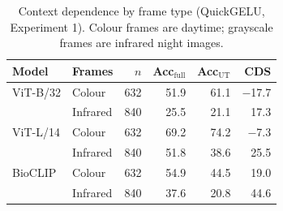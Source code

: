 \begin{table}[t]
\caption{Context dependence by frame type (QuickGELU, Experiment 1). Colour frames are daytime; grayscale frames are infrared night images.}
\label{tab:daynight}
\centering\footnotesize
\setlength{\tabcolsep}{4pt}
\begin{tabular}{ll r rrr}
\toprule
Model & Frames & $n$ & Acc$_\text{full}$ & Acc$_\text{UT}$ & CDS \\
\midrule
ViT-B/32 & Colour & 632 & 51.9 & 61.1 & $-$17.7 \\
 & Infrared & 840 & 25.5 & 21.1 & 17.3 \\
\midrule
ViT-L/14 & Colour & 632 & 69.2 & 74.2 & $-$7.3 \\
 & Infrared & 840 & 51.8 & 38.6 & 25.5 \\
\midrule
BioCLIP & Colour & 632 & 54.9 & 44.5 & 19.0 \\
 & Infrared & 840 & 37.6 & 20.8 & 44.6 \\
\bottomrule
\end{tabular}
\end{table}
